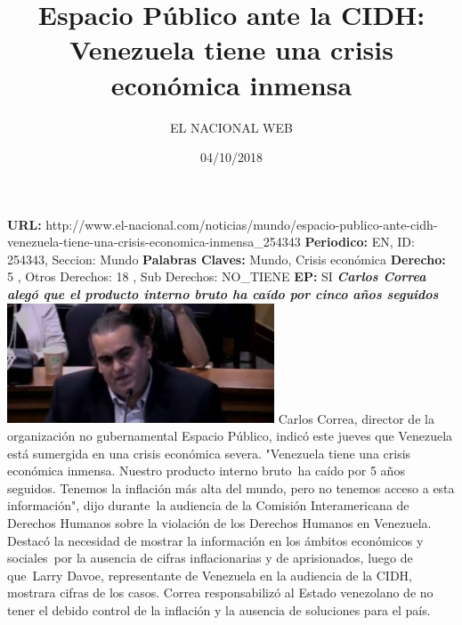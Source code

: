 \documentclass{article}%
\title{\textbf{Espacio Público ante la CIDH: Venezuela tiene una crisis económica inmensa}}%
\author{EL NACIONAL WEB}%
\date{04/10/2018}%
\begin{document}
%
\normalsize%
\maketitle%
\textbf{URL: }%
http://www.el{-}nacional.com/noticias/mundo/espacio{-}publico{-}ante{-}cidh{-}venezuela{-}tiene{-}una{-}crisis{-}economica{-}inmensa\_254343\newline%
%
\textbf{Periodico: }%
EN, %
ID: %
254343, %
Seccion: %
Mundo\newline%
%
\textbf{Palabras Claves: }%
Mundo, Crisis económica\newline%
%
\textbf{Derecho: }%
5%
, Otros Derechos: %
18%
, Sub Derechos: %
NO\_TIENE%
\newline%
%
\textbf{EP: }%
SI\newline%
\newline%
%
\textbf{\textit{Carlos Correa alegó que el producto interno bruto ha caído por cinco años seguidos}}%
\newline%
\newline%
%
\includegraphics[width=300px]{82.jpg}%
\newline%
%
Carlos Correa, director de la organización no gubernamental Espacio Público, indicó este jueves que Venezuela está sumergida en una crisis económica severa.%
\newline%
%
"Venezuela tiene una crisis económica inmensa. Nuestro producto interno bruto~ha caído por 5 años seguidos. Tenemos la inflación más alta del mundo, pero no tenemos acceso a esta información", dijo durante~la audiencia de la Comisión Interamericana de Derechos Humanos sobre la violación de los Derechos Humanos en Venezuela.%
\newline%
%
Destacó la necesidad de mostrar la información en los ámbitos económicos y sociales~por la ausencia de cifras inflacionarias y de aprisionados, luego de que~Larry Davoe, representante de Venezuela en la audiencia de la CIDH, mostrara cifras de los casos.%
\newline%
%
Correa responsabilizó al Estado venezolano de no tener el debido control de la inflación y la ausencia de soluciones para el país.%
\newline%
%
\end{document}
